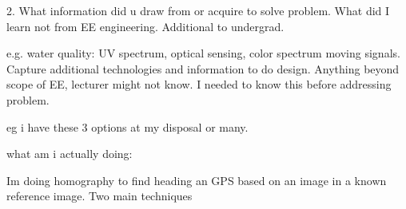 2. What information did u draw from or acquire to solve problem. What did I learn not from EE engineering. Additional to undergrad. 

e.g. water quality: UV spectrum, optical sensing, color spectrum moving signals. Capture additional technologies and information to do design. Anything beyond scope of EE, lecturer might not know. I needed to know this before addressing problem. 

eg i have these 3 options at my disposal or many. 



what am i actually doing: 

Im doing homography to find heading an GPS based on an image in a known reference image. 
Two main techniques 